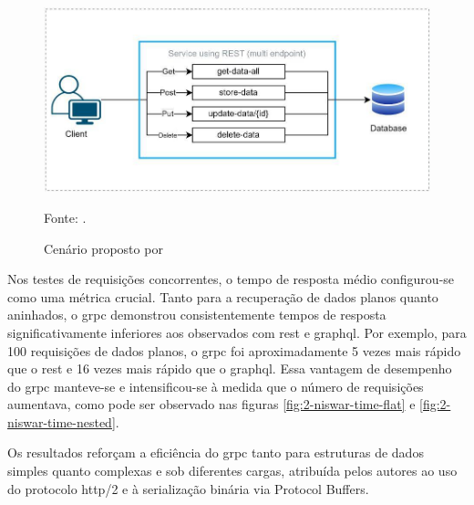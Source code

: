 \begin{figure}[H]
    \caption{Cenário proposto por \textcite{niswar_performance_2024}}
    \label{fig:2-niswar-1}
    \centering
    \includegraphics[width=0.75\linewidth]{imagens/niswar-1-enviroment.jpg}    
    {\par \raggedright \footnotesize Fonte: \textcite{niswar_performance_2024}.\par}
\end{figure}

Nos testes de requisições concorrentes, o tempo de resposta médio configurou-se como uma métrica crucial. Tanto para a recuperação de dados planos quanto aninhados, o \gls{grpc} demonstrou consistentemente tempos de resposta significativamente inferiores aos observados com \gls{rest} e \acrshort{graphql}. Por exemplo, para 100 requisições de dados planos, o \gls{grpc} foi aproximadamente 5 vezes mais rápido que o \gls{rest} e 16 vezes mais rápido que o \acrshort{graphql}. Essa vantagem de desempenho do \gls{grpc} manteve-se e intensificou-se à medida que o número de requisições aumentava, como pode ser observado nas figuras \ref{fig:2-niswar-time-flat} e \ref{fig:2-niswar-time-nested}.

Os resultados reforçam a eficiência do \gls{grpc} tanto para estruturas de dados simples quanto complexas e sob diferentes cargas, atribuída pelos autores ao uso do protocolo \acrshort{http}/2 e à serialização binária via Protocol Buffers.

